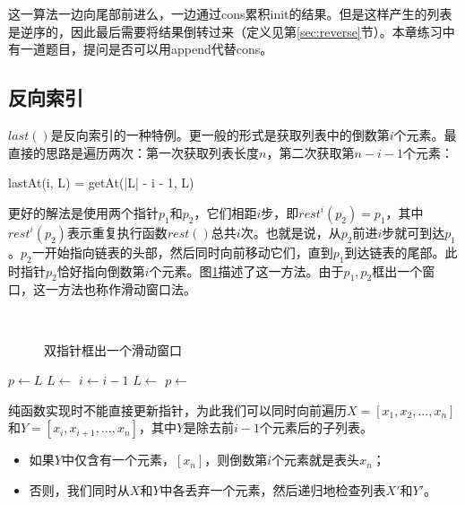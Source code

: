 \documentclass[b5paper]{ctexart}
\begin{document}
这一算法一边向尾部前进么，一边通过cons累积init的结果。但是这样产生的列表是逆序的，因此最后需要将结果倒转过来（定义见第\ref{sec:reverse}节）。本章练习中有一道题目，提问是否可以用append代替cons。

\subsection{反向索引}
 

$last()$是反向索引的一种特例。更一般的形式是获取列表中的倒数第$i$个元素。最直接的思路是遍历两次：第一次获取列表长度$n$，第二次获取第$n - i - 1$个元素：

\be
  lastAt(i, L) = getAt(|L| - i - 1, L)
\ee

更好的解法是使用两个指针$p_1$和$p_2$，它们相距$i$步，即$rest^i(p_2) = p_1$，其中$rest^i(p_2)$表示重复执行函数$rest()$总共$i$次。也就是说，从$p_2$前进$i$步就可到达$p_1$。$p_2$一开始指向链表的头部，然后同时向前移动它们，直到$p_1$到达链表的尾部。此时指针$p_2$恰好指向倒数第$i$个元素。图\ref{fig:list-rindex}描述了这一方法。由于$p_1, p_2$框出一个窗口，这一方法也称作滑动窗口法。

\begin{figure}[htbp]
    \centering
     \\
    \caption{双指针框出一个滑动窗口}
    \label{fig:list-rindex}
\end{figure}

\begin{algorithmic}[1]
  \State $p \gets L$
    \State $L \gets $  
    \State $i \gets i - 1$
  \EndWhile
    \State $L \gets$ 
    \State $p \gets$ 
  \EndWhile
  \State \Return {}
\EndFunction
\end{algorithmic}

纯函数实现时不能直接更新指针，为此我们可以同时向前遍历$X = [x_1, x_2, ..., x_n]$和$Y = [x_i, x_{i+1}, ..., x_n]$，其中$Y$是除去前$i-1$个元素后的子列表。

\begin{itemize}
\item 如果$Y$中仅含有一个元素，$[x_n]$，则倒数第$i$个元素就是表头$x_n$；
\item 否则，我们同时从$X$和$Y$中各丢弃一个元素，然后递归地检查列表$X'$和$Y'$。
\end{itemize}
\end{document}
